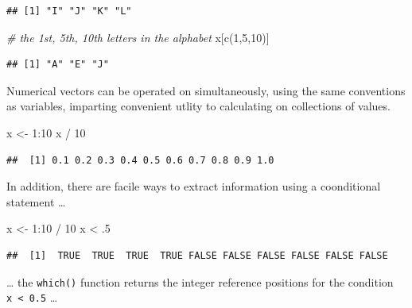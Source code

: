 \documentclass[
]{book}
\newenvironment{Shaded}{\begin{snugshade}}{\end{snugshade}}
\newcommand{\CommentTok}[1]{\textcolor[rgb]{0.56,0.35,0.01}{\textit{#1}}}
\newcommand{\DecValTok}[1]{\textcolor[rgb]{0.00,0.00,0.81}{#1}}
\newcommand{\FunctionTok}[1]{\textcolor[rgb]{0.00,0.00,0.00}{#1}}
\newcommand{\NormalTok}[1]{#1}
\newcommand{\OtherTok}[1]{\textcolor[rgb]{0.56,0.35,0.01}{#1}}
\newcommand{\SpecialCharTok}[1]{\textcolor[rgb]{0.00,0.00,0.00}{#1}}
\begin{document}
\begin{verbatim}
## [1] "I" "J" "K" "L"
\end{verbatim}

\begin{Shaded}
\begin{Highlighting}[]
\CommentTok{\# the 1st, 5th, 10th letters in the alphabet}
\NormalTok{x[}\FunctionTok{c}\NormalTok{(}\DecValTok{1}\NormalTok{,}\DecValTok{5}\NormalTok{,}\DecValTok{10}\NormalTok{)]}
\end{Highlighting}
\end{Shaded}

\begin{verbatim}
## [1] "A" "E" "J"
\end{verbatim}

Numerical vectors can be operated on simultaneously, using the same conventions as variables, imparting convenient utlity to calculating on collections of values.

\begin{Shaded}
\begin{Highlighting}[]
\NormalTok{x }\OtherTok{\textless{}{-}} \DecValTok{1}\SpecialCharTok{:}\DecValTok{10}
\NormalTok{x }\SpecialCharTok{/} \DecValTok{10}
\end{Highlighting}
\end{Shaded}

\begin{verbatim}
##  [1] 0.1 0.2 0.3 0.4 0.5 0.6 0.7 0.8 0.9 1.0
\end{verbatim}

In addition, there are facile ways to extract information using a coonditional statement \ldots{}

\begin{Shaded}
\begin{Highlighting}[]
\NormalTok{x }\OtherTok{\textless{}{-}} \DecValTok{1}\SpecialCharTok{:}\DecValTok{10} \SpecialCharTok{/} \DecValTok{10}
\NormalTok{x }\SpecialCharTok{\textless{}}\NormalTok{ .}\DecValTok{5}
\end{Highlighting}
\end{Shaded}

\begin{verbatim}
##  [1]  TRUE  TRUE  TRUE  TRUE FALSE FALSE FALSE FALSE FALSE FALSE
\end{verbatim}

\ldots{} the \texttt{which()} function returns the integer reference positions for the condition \texttt{x\ \textless{}\ 0.5} \ldots{}
\end{document}

